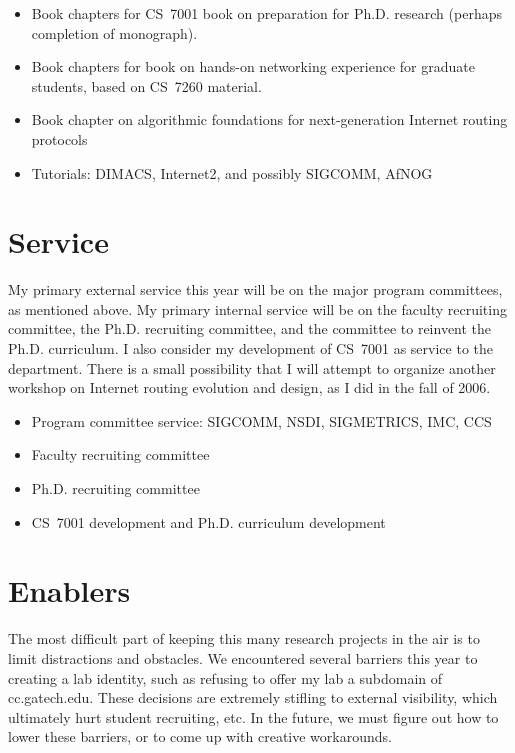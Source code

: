 \begin{sloppypar}
\begin{itemize}
\itemsep=-1pt
\item Book chapters for CS~7001 book on preparation for Ph.D. research
  (perhaps completion of monograph).
\item Book chapters for book on hands-on networking experience for
  graduate students, based on CS~7260 material.
\item Book chapter on algorithmic foundations for next-generation
  Internet routing protocols
\item Tutorials: DIMACS, Internet2, and possibly SIGCOMM, AfNOG
\end{itemize}

\section*{Service}

My primary external service this year will be on the major program
committees, as mentioned above.  My primary internal service will be on
the faculty recruiting committee, the Ph.D. recruiting committee, and
the committee to reinvent the Ph.D. curriculum.  I also consider my
development of CS~7001 as service to the department.  There is a small
possibility that I will attempt to organize another workshop on Internet
routing evolution and design, as I did in the fall of 2006.

\begin{itemize}
\itemsep=-1pt
\item Program committee service: SIGCOMM, NSDI, SIGMETRICS, IMC, CCS
\item Faculty recruiting committee
\item Ph.D. recruiting committee
\item CS~7001 development and Ph.D. curriculum development
\end{itemize}

\section*{Enablers}

The most difficult part of keeping this many research projects in the
air is to limit distractions and obstacles.  We encountered several
barriers this year to creating a lab identity, such as refusing to offer
my lab a subdomain of cc.gatech.edu.  These decisions are extremely
stifling to external visibility, which ultimately hurt student
recruiting, etc.  In the future, we must figure out how to lower these
barriers, or to come up with creative workarounds.


\end{sloppypar}
